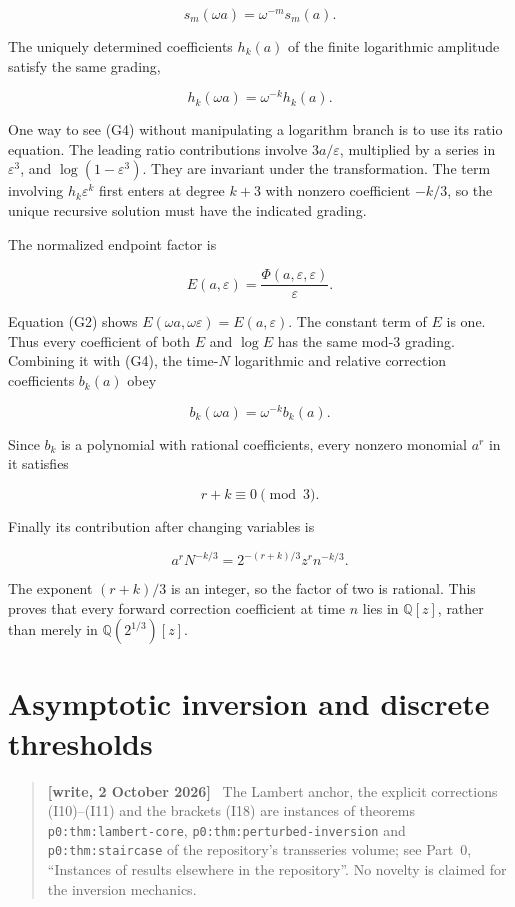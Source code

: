 \documentclass[11pt,letterpaper]{article}
\numberwithin{equation}{section}
\theoremstyle{remark}
\newenvironment{writenote}{\par\smallskip\begin{quote}\small\textbf{[write, 2 October 2026]}\ }{\end{quote}\smallskip}
\newcommand{\repopath}[1]{\nolinkurl{#1}}
\begin{document}
\[
s_m(\omega a)=\omega^{-m}s_m(a).
\tag{G3}
\]

The uniquely determined coefficients \(h_k(a)\) of the finite logarithmic amplitude satisfy the same grading,

\[
h_k(\omega a)=\omega^{-k}h_k(a).
\tag{G4}
\]

One way to see (G4) without manipulating a logarithm branch is to use its ratio equation. The leading ratio contributions involve \(3a/\varepsilon\), multiplied by a series in \(\varepsilon^3\), and \(\log(1-\varepsilon^3)\). They are invariant under the transformation. The term involving \(h_k \varepsilon^k\) first enters at degree \(k+3\) with nonzero coefficient \(-k/3\), so the unique recursive solution must have the indicated grading.

The normalized endpoint factor is

\[
E(a,\varepsilon)=\frac{\Phi(a,\varepsilon,\varepsilon)}{\varepsilon}.
\]

Equation (G2) shows \(E(\omega a,\omega \varepsilon)=E(a,\varepsilon)\). The constant term of \(E\) is one. Thus every coefficient of both \(E\) and \(\log E\) has the same mod-3 grading. Combining it with (G4), the time-\(N\) logarithmic and relative correction coefficients \(b_k(a)\) obey

\[
b_k(\omega a)=\omega^{-k}b_k(a).
\tag{G5}
\]

Since \(b_k\) is a polynomial with rational coefficients, every nonzero monomial \(a^r\) in it satisfies

\[
r+k\equiv0\pmod3.
\]

Finally its contribution after changing variables is

\[
a^rN^{-k/3}
=2^{-(r+k)/3}z^r n^{-k/3}.
\]

The exponent \((r+k)/3\) is an integer, so the factor of two is rational. This proves that every forward correction coefficient at time \(n\) lies in \(\mathbb Q[z]\), rather than merely in \(\mathbb Q(2^{1/3})[z]\).

\section{Asymptotic inversion and discrete thresholds}\label{air:rb:asymptotic-inversion-and-discrete-thresholds}
\begin{writenote}
The Lambert anchor, the explicit corrections (I10)--(I11) and the brackets (I18) are instances of theorems \repopath{p0:thm:lambert-core}, \repopath{p0:thm:perturbed-inversion} and \repopath{p0:thm:staircase} of the repository's transseries volume; see Part~0, ``Instances of results elsewhere in the repository''. No novelty is claimed for the inversion mechanics.
\end{writenote}
\end{document}
